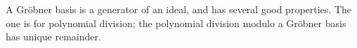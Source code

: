 \documentclass[10pt]{article}
\begin{document}
A Gr\"obner basis is a generator of an ideal, and has several good properties.
The one is for polynomial division; the polynomial division modulo a Gr\"obner basis has unique remainder.
\end{document}

